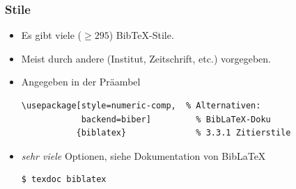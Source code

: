 \begin{frame}[fragile]
  \frametitle{Stile}
  \begin{itemize}
    \item Es gibt viele ($\geq 295$) Bib\TeX-Stile.
    \item Meist durch andere (Institut, Zeitschrift, etc.) vorgegeben.
    \item Angegeben in der Präambel
\begin{lstlisting}
\usepackage[style=numeric-comp,  % Alternativen:
            backend=biber]         % BibLaTeX-Doku
           {biblatex}              % 3.3.1 Zitierstile
\end{lstlisting}
\item<+-> \emph{sehr viele} Optionen, siehe Dokumentation von Bib\LaTeX
\begin{verbatim}
$ texdoc biblatex
\end{verbatim}
  \end{itemize}

\end{frame}







